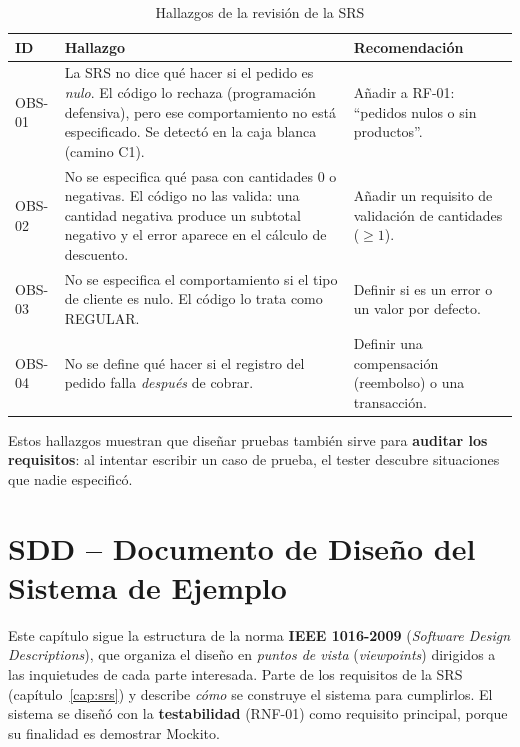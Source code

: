 \documentclass[11pt,a4paper,oneside]{report}
\begin{document}
\begin{table}[H]
\centering
\caption{Hallazgos de la revisión de la SRS}
\small
\begin{tabularx}{\linewidth}{lXX}
\toprule
\textbf{ID} & \textbf{Hallazgo} & \textbf{Recomendación}\\
\midrule
OBS-01 & La SRS no dice qué hacer si el pedido es \emph{nulo}. El código lo rechaza (programación defensiva), pero ese comportamiento no está especificado. Se detectó en la caja blanca (camino C1). & Añadir a RF-01: ``pedidos nulos o sin productos''.\\
OBS-02 & No se especifica qué pasa con cantidades 0 o negativas. El código no las valida: una cantidad negativa produce un subtotal negativo y el error aparece en el cálculo de descuento. & Añadir un requisito de validación de cantidades ($\geq 1$).\\
OBS-03 & No se especifica el comportamiento si el tipo de cliente es nulo. El código lo trata como REGULAR. & Definir si es un error o un valor por defecto.\\
OBS-04 & No se define qué hacer si el registro del pedido falla \emph{después} de cobrar. & Definir una compensación (reembolso) o una transacción.\\
\bottomrule
\end{tabularx}
\end{table}

\begin{nota}
Estos hallazgos muestran que diseñar pruebas también sirve para \textbf{auditar los requisitos}: al intentar escribir un caso de prueba, el tester descubre situaciones que nadie especificó.
\end{nota}

\chapter{SDD -- Documento de Diseño del Sistema de Ejemplo}
\label{cap:sdd}

Este capítulo sigue la estructura de la norma \textbf{IEEE 1016-2009} (\emph{Software Design Descriptions}), que organiza el diseño en \emph{puntos de vista} (\emph{viewpoints}) dirigidos a las inquietudes de cada parte interesada. Parte de los requisitos de la SRS (capítulo~\ref{cap:srs}) y describe \emph{cómo} se construye el sistema para cumplirlos. El sistema se diseñó con la \textbf{testabilidad} (RNF-01) como requisito principal, porque su finalidad es demostrar Mockito.
\end{document}
